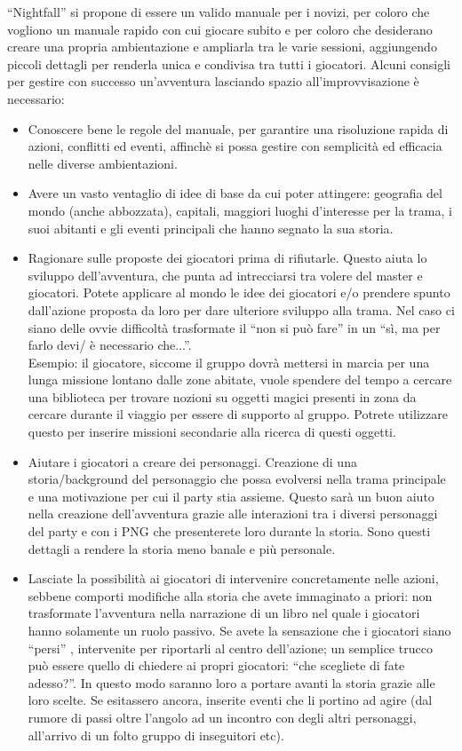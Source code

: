 \documentclass[../manuale_main.tex]{subfiles}
\begin{document}
``Nightfall” si propone di essere un valido manuale per i novizi, per coloro che vogliono un manuale rapido con cui giocare subito e per coloro che desiderano creare una propria ambientazione e ampliarla tra le varie sessioni, aggiungendo piccoli dettagli per renderla unica e condivisa tra tutti i giocatori. 
Alcuni consigli per gestire con successo un’avventura lasciando spazio all’improvvisazione è necessario:
\begin{itemize}
\item Conoscere bene le regole del manuale, per garantire una risoluzione rapida di azioni, conflitti ed eventi, affinchè si possa gestire con semplicità ed efficacia nelle diverse ambientazioni.
\item Avere un vasto ventaglio di idee di base da cui poter attingere: geografia del mondo (anche abbozzata), capitali, maggiori luoghi d'interesse per la trama, i suoi abitanti e gli eventi principali che hanno segnato la sua storia.
\item Ragionare sulle proposte dei giocatori prima di rifiutarle. Questo aiuta lo sviluppo dell’avventura, che punta ad intrecciarsi tra volere del master e giocatori. Potete applicare al mondo le idee dei giocatori  e/o prendere spunto dall’azione proposta da loro per dare ulteriore sviluppo alla trama. Nel caso ci siano delle ovvie difficoltà trasformate il “non si può fare” in un “sì, ma per farlo devi/ è necessario che...”. \\
Esempio: il giocatore, siccome il gruppo dovrà mettersi in marcia per una lunga missione lontano dalle zone abitate, vuole spendere del tempo a cercare una biblioteca per trovare nozioni su oggetti magici presenti in zona da cercare durante il viaggio per essere di supporto al gruppo. Potrete utilizzare questo per inserire missioni secondarie alla ricerca di questi oggetti.
\item Aiutare i giocatori a creare dei personaggi. Creazione di una storia/background del personaggio che possa evolversi nella trama principale e una motivazione per cui il party stia assieme. Questo sarà un buon aiuto nella creazione dell’avventura grazie alle interazioni tra i diversi personaggi del party e con i PNG che presenterete loro durante la storia.
Sono questi dettagli a rendere la storia meno banale e più personale.
\item Lasciate la possibilità ai giocatori di intervenire concretamente nelle azioni, sebbene comporti modifiche alla storia che avete immaginato a priori: non trasformate l’avventura nella narrazione di un libro nel quale i giocatori hanno solamente un ruolo passivo. Se avete la sensazione che i giocatori siano “persi” , intervenite per riportarli al centro dell’azione; un semplice trucco può essere quello di chiedere ai propri giocatori: “che scegliete di fate adesso?”. In questo modo saranno loro a portare avanti la storia grazie alle loro scelte. Se esitassero ancora, inserite eventi che li portino ad agire (dal rumore di passi oltre l’angolo ad un incontro con degli altri personaggi, all’arrivo di un folto gruppo di inseguitori etc).
\end{itemize}
\end{document}
